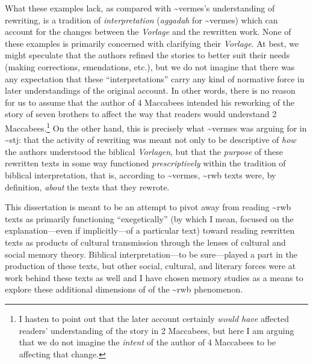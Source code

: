 What these examples lack, as compared with \textasciitilde{}vermes's
understanding of rewriting, is a tradition of \emph{interpretation}
(\emph{aggadah} for \textasciitilde{}vermes) which can account for the
changes between the \emph{Vorlage} and the rewritten work. None of these
examples is primarily concerned with clarifying their \emph{Vorlage}. At
best, we might speculate that the authors refined the stories to better
suit their needs (making corrections, emendations, etc.), but we do not
imagine that there was any expectation that these ``interpretations''
carry any kind of normative force in later understandings of the
original account. In other words, there is no reason for us to assume
that the author of 4 Maccabees intended his reworking of the story of
seven brothers to affect the way that readers would understand 2
Maccabees.\footnote{I hasten to point out that the later account
  certainly \emph{would have} affected readers' understanding of the
  story in 2 Maccabees, but here I am arguing that we do not imagine the
  \emph{intent} of the author of 4 Maccabees to be affecting that
  change.} On the other hand, this is precisely what
\textasciitilde{}vermes was arguing for in \textasciitilde{}stj: that
the activity of rewriting was meant not only to be descriptive of
\emph{how} the authors understood the biblical \emph{Vorlagen}, but that
the \emph{purpose} of these rewritten texts in some way functioned
\emph{prescriptively} within the tradition of biblical interpretation,
that is, according to \textasciitilde{}vermes, \textasciitilde{}rwb
texts were, by definition, \emph{about} the texts that they rewrote.

This dissertation is meant to be an attempt to pivot away from reading
\textasciitilde{}rwb texts as primarily functioning ``exegetically'' (by
which I mean, focused on the explanation---even if implicitly---of a
particular text) toward reading rewritten texts as products of cultural
transmission through the lenses of cultural and social memory theory.
Biblical interpretation---to be sure---played a part in the production
of these texts, but other social, cultural, and literary forces were at
work behind these texts as well and I have chosen memory studies as a
means to explore these additional dimensions of of the
\textasciitilde{}rwb phenomenon.
